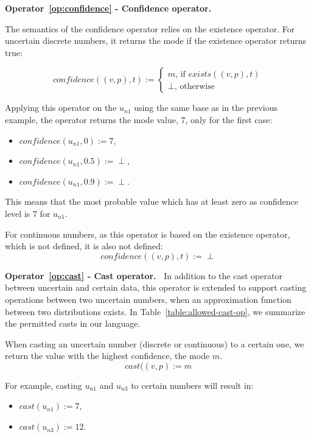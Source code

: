 \bigskip

\noindent\textbf{Operator~\ref{op:confidence} - Confidence operator.~}

The semantics of the confidence operator relies on the existence operator.
For uncertain discrete numbers, it returns the mode if the existence operator returns true:

$$confidence((v, p), t) :=  \begin{cases}
                                            m \text{, if } exists((v, p), t)\\
                                            \perp \text{, otherwise}
                                         \end{cases}$$
                                      
Applying this operator on the $u_{n1}$ using the same base as in the previous example, the operator returns the mode value, 7, only for the first case:
 \begin{itemize}
    \item $confidence(u_{n1}, 0) := 7$,
    \item $confidence(u_{n1}, 0.5) := \perp$,
    \item $confidence(u_{n1}, 0.9) := \perp$.
\end{itemize}

This means that the most probable value which has at least zero as confidence level is 7 for $u_{n1}$. 

For continuous numbers, as this operator is based on the existence operator, which is not defined, it is also not defined:
$$confidence((v, p), t) :=  \perp$$

\bigskip

\noindent\textbf{Operator~\ref{op:cast} - Cast operator.~}
In addition to the cast operator between uncertain and certain data, this operator is extended to support casting operations between two uncertain numbers, when an approximation function between two distributions exists.
In Table~\ref{table:allowed-cast-op}, we summarize the permitted casts in our language.

When casting an uncertain number (discrete or continuous) to a certain one, we return the value with the highest confidence, \ie the mode $m$.
$$cast((v, p) := m$$

For example, casting $u_{n1}$ and $u_{n3}$ to certain numbers will result in:
\begin{itemize}
	\item $cast(u_{n1}) := 7$,
	\item $cast(u_{n3}) := 12$.
\end{itemize}

